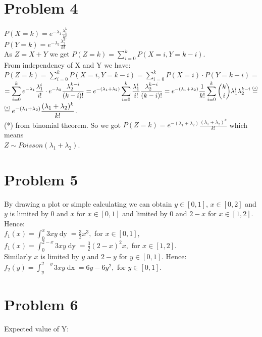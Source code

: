 \documentclass[11pt,wide]{article}
\newcommand\numeq[1]%
  {\stackrel{\scriptscriptstyle \mkern-1.5mu#1\mkern-1.5mu }{=}}
\begin{document}
\section{Problem 4\textdegree}
\(\displaystyle P(X=k) = e^{-\lambda_1} \frac{\lambda_1^k}{k!} \) \\
\(\displaystyle P(Y=k) = e^{-\lambda_2} \frac{\lambda_2^k}{k!} \) \\
As \(\displaystyle Z = X + Y \) we get \(\displaystyle P(Z=k) = \sum_{i=0}^k P(X=i, Y=k-i) \). \\
From independency of X and Y we have:\\ \(\displaystyle P(Z=k) = \sum_{i=0}^k P(X=i, Y=k-i) = \sum_{i=0}^k P(X=i)\cdot P(Y=k-i) = \)\\
\(\displaystyle = \sum_{i=0}^k e^{-\lambda_1} \frac{\lambda_1^i}{i!} \cdot e^{-\lambda_2} \frac{\lambda_2^{k-i}}{(k-i)!} =
e^{-(\lambda_1 + \lambda_2)} \sum_{i=0}^k \frac{\lambda_1^i}{i!} \frac{\lambda_2^{k-i}}{(k-i)!} = 
e^{-(\lambda_1 + \lambda_2)} \frac{1}{k!} \sum_{i=0}^k \binom{k}{i} \lambda_1^i \lambda_2^{k-i} \numeq{(*)} \) \\
\(\displaystyle \numeq{(*)} e^{-(\lambda_1 + \lambda_2)} \frac{(\lambda_1 + \lambda_2)^k}{k!} \). \\
(*) from binomial theorem.
So we got \(\displaystyle P(Z=k) = e^{-(\lambda_1 + \lambda_2)} \frac{(\lambda_1 + \lambda_2)^k}{k!} \) which means \\ \(Z\sim Poisson(\lambda_1 + \lambda_2) \).

\section{Problem 5\textdegree}
By drawing a plot or simple calculating we can obtain \(y \in [0, 1]\), \(x \in [0, 2] \) and \(y\) is limited by $0$ and $x$ for $x \in [0,1]$ and limited by $0$ and $2-x$ for $x \in [1,2]$. Hence:\\
\( \displaystyle f_1(x) = \int_0^x 3xy \mathop{dy} = \frac{3}{2}x^3,\) for  \(  x \in [0,1]\),\\
\( \displaystyle f_1(x) = \int_0^{2-x} 3xy \mathop{dy} = \frac{3}{2}(2-x)^2 x,\) for  \(  x \in [1,2]\).\\
Similarly $x$ is limited by $y$ and $2-y$ for $y \in [0,1]$. Hence: \\
\( \displaystyle f_2(y) = \int_y^{2-y} 3xy \mathop{dx} = 6 y - 6 y^2,\) for  \(  y \in [0,1]\).\\


\section{Problem 6\textdegree}
Expected value of Y: \\
\end{document}
